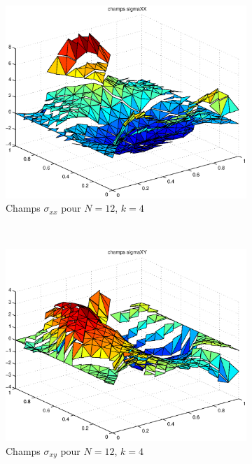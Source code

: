 \begin{figure}[h!]
\begin{subfigure}[b]{0.32\textwidth}
  \includegraphics[width=\textwidth]{images/sigmaxxk4.eps}
  \caption{Champs $\sigma_{xx}$ pour $N=12$, $k=4$}
  \end{subfigure}
  ~
  \begin{subfigure}[b]{0.32\textwidth}
  \includegraphics[width=\textwidth]{images/sigmaxyk4.eps}
  \caption{Champs $\sigma_{xy}$ pour $N=12$, $k=4$}
  \end{subfigure}
  ~
  \begin{subfigure}[b]{0.32\textwidth}

\end{subfigure}
\end{figure}
